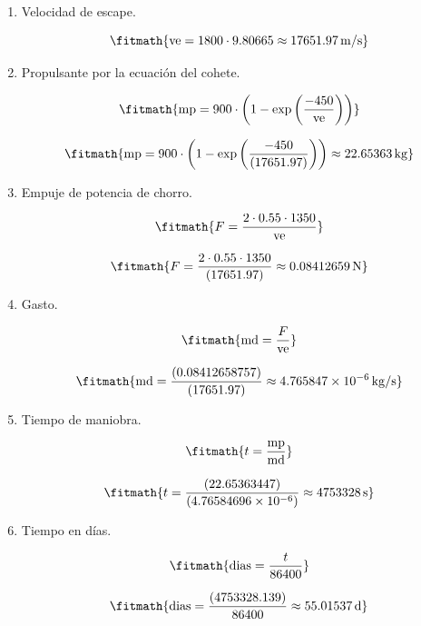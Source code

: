 \begin{enumerate}

\item Velocidad de escape.

\[\fitmath{\mathrm{ve}=1800\cdot 9.80665\approx 17651.97\,\mathrm{m/s}}\]

\item Propulsante por la ecuación del cohete.

\[\fitmath{\mathrm{mp}=900\cdot \left(1-\exp\left(\frac{-450}{\mathrm{ve}}\right)\right)}\]

\[\fitmath{\mathrm{mp}=900\cdot \left(1-\exp\left(\frac{-450}{(17651.97)}\right)\right)\approx 22.65363\,\mathrm{kg}}\]

\item Empuje de potencia de chorro.

\[\fitmath{F=\frac{2\cdot 0.55\cdot 1350}{\mathrm{ve}}}\]

\[\fitmath{F=\frac{2\cdot 0.55\cdot 1350}{(17651.97)}\approx 0.08412659\,\mathrm{N}}\]

\item Gasto.

\[\fitmath{\mathrm{md}=\frac{F}{\mathrm{ve}}}\]

\[\fitmath{\mathrm{md}=\frac{(0.08412658757)}{(17651.97)}\approx 4.765847\times10^{-6}\,\mathrm{kg/s}}\]

\item Tiempo de maniobra.

\[\fitmath{t=\frac{\mathrm{mp}}{\mathrm{md}}}\]

\[\fitmath{t=\frac{(22.65363447)}{(4.76584696\times10^{-6})}\approx 4753328\,\mathrm{s}}\]

\item Tiempo en días.

\[\fitmath{\mathrm{dias}=\frac{t}{86400}}\]

\[\fitmath{\mathrm{dias}=\frac{(4753328.139)}{86400}\approx 55.01537\,\mathrm{d}}\]

\end{enumerate}
